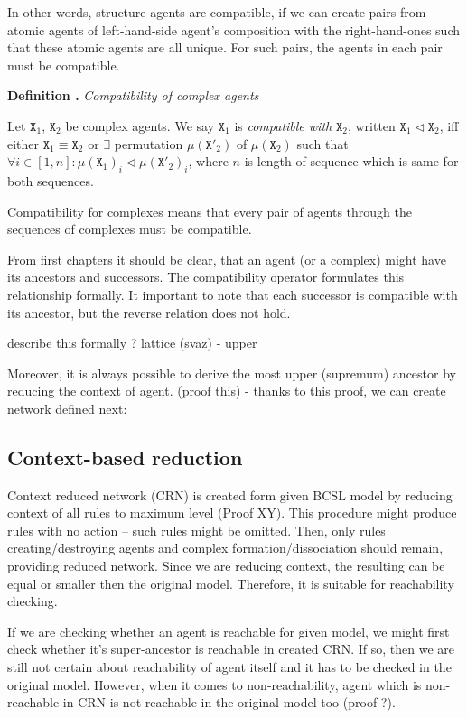 \documentclass[12pt]{fithesis2}
\newcounter{counter}[section]
\renewcommand{\thecounter}{\thesection.\arabic{counter}}
\newenvironment{definition}[1]{\bigskip\refstepcounter{counter}\noindent\textbf{Definition \thecounter } \textit{#1} \par\nopagebreak}{\bigskip}
\begin{document}
In other words, structure agents are compatible, if we can create pairs from atomic agents of left-hand-side agent's composition with the right-hand-ones such that these atomic agents are all unique. For such pairs, the agents in each pair must be compatible.

\begin{definition}{Compatibility of complex agents}
Let $\mathtt{X}_1$, $\mathtt{X}_2$ be complex agents. We say $\mathtt{X}_1$ is \emph{compatible with} $\mathtt{X}_2$, written $\mathtt{X}_1 \lhd \mathtt{X}_2$, iff either $\mathtt{X}_1 \equiv \mathtt{X}_2$ or $\exists$ permutation $ \mu(\mathtt{X}'_2)$ of $\mu(\mathtt{X}_2)$ such that $ \forall i \in [1, n] : \mu(\mathtt{X}_1)_i \lhd \mu(\mathtt{X}'_2)_i $, where $n$ is length of sequence which is same for both sequences.
\end{definition}

Compatibility for complexes means that every pair of agents through the sequences of complexes must be compatible.

From first chapters it should be clear, that an agent (or a complex) might have its ancestors and successors. The compatibility operator formulates this relationship formally. It important to note that each successor is compatible with its ancestor, but the reverse relation does not hold. 

describe this formally ? lattice (svaz) - upper

Moreover, it is always possible to derive the most upper (supremum) ancestor by reducing the context of agent. (proof this) - thanks to this proof, we can create network defined next:

\subsection{Context-based reduction}

Context reduced network (CRN) is created form given BCSL model by reducing context of all rules to maximum level (Proof XY). This procedure might produce rules with no action -- such rules might be omitted. Then, only rules creating/destroying agents and complex formation/dissociation should remain, providing reduced network. Since we are reducing context, the resulting can be equal or smaller then the original model. Therefore, it is suitable for reachability checking. 

If we are checking whether an agent is reachable for given model, we might first check whether it's super-ancestor is reachable in created CRN. If so, then we are still not certain about reachability of agent itself and it has to be checked in the original model. However, when it comes to non-reachability, agent which is non-reachable in CRN is not reachable in the original model too (proof ?).
\end{document}

